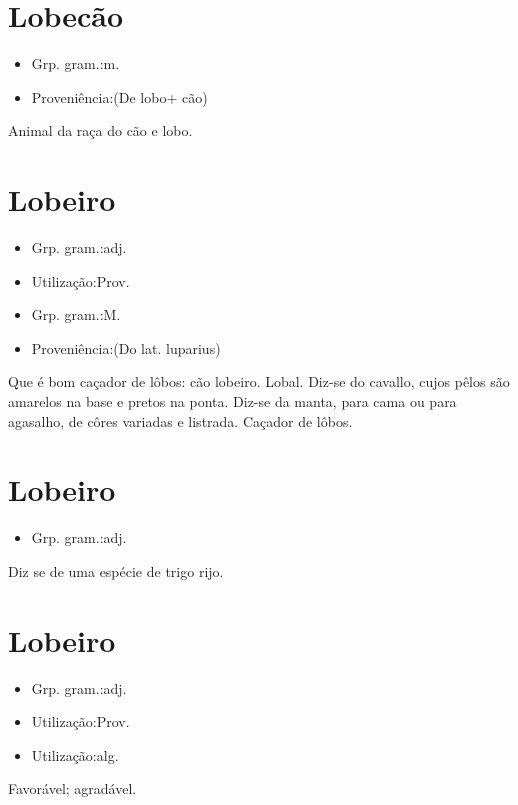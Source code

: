 \section{Lobecão}
\begin{itemize}
\item {Grp. gram.:m.}
\end{itemize}
\begin{itemize}
\item {Proveniência:(De \textunderscore lobo\textunderscore  + \textunderscore cão\textunderscore )}
\end{itemize}
Animal da raça do cão e lobo.
\section{Lobeiro}
\begin{itemize}
\item {Grp. gram.:adj.}
\end{itemize}
\begin{itemize}
\item {Utilização:Prov.}
\end{itemize}
\begin{itemize}
\item {Grp. gram.:M.}
\end{itemize}
\begin{itemize}
\item {Proveniência:(Do lat. \textunderscore luparius\textunderscore )}
\end{itemize}
Que é bom caçador de lôbos: \textunderscore cão lobeiro\textunderscore .
Lobal.
Diz-se do cavallo, cujos pêlos são amarelos na base e pretos na ponta.
Diz-se da manta, para cama ou para agasalho, de côres variadas e listrada.
Caçador de lôbos.
\section{Lobeiro}
\begin{itemize}
\item {Grp. gram.:adj.}
\end{itemize}
Diz se de uma espécie de trigo rijo.
\section{Lobeiro}
\begin{itemize}
\item {Grp. gram.:adj.}
\end{itemize}
\begin{itemize}
\item {Utilização:Prov.}
\end{itemize}
\begin{itemize}
\item {Utilização:alg.}
\end{itemize}
Favorável; agradável.
